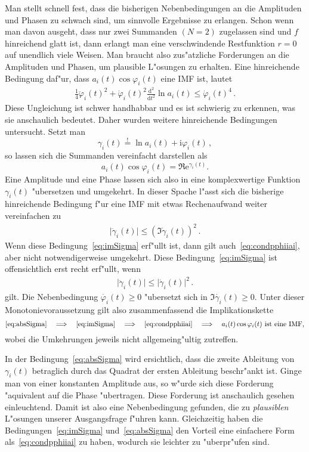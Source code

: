 \documentclass[a4paper]{scrartcl}
\newcommand{\de}{{\mathrm{d}}}
\newcommand{\ee}{{\mathrm{e}}}
\newcommand{\ii}{{\mathrm{i}}}
\newcommand{\pphi}{{\varphi}}
\newcommand{\defeq}{\overset{!}{=}}
\begin{document}
Man stellt schnell fest, dass die bisherigen Nebenbedingungen an die Amplituden und Phasen zu schwach sind, um sinnvolle Ergebnisse zu erlangen. 
Schon wenn man davon ausgeht, dass nur zwei Summanden $(N=2)$ zugelassen sind und $f$ hinreichend glatt ist, dann erlangt man eine verschwindende Restfunktion $r=0$ auf unendlich viele Weisen.
Man braucht also zus"atzliche Forderungen an die Amplituden und Phasen, um plausible L"osungen zu erhalten. 
Eine hinreichende Bedingung daf"ur, dass $a_i(t)\cos\pphi_i(t)$ eine IMF ist, lautet
\begin{align} \label{eq:condpphiiai}
  \frac14\ddot\pphi_i(t)^2 + \dot\pphi_i(t)^2\frac{\de^2}{\de t^2}\ln a_i(t) 
  \le \dot\pphi_i(t)^4\,.
\end{align}
Diese Ungleichung ist schwer handhabbar und es ist schwierig zu erkennen, was sie anschaulich bedeutet. 
Daher wurden weitere hinreichende Bedingungen untersucht. 
Setzt man
$$ \gamma_i(t) \defeq \ln a_i(t) + \ii\pphi_i(t)\,, $$
so lassen sich die Summanden vereinfacht darstellen als
$$ a_i(t)\cos\pphi_i(t) = \Re \ee^{\gamma_i(t)}. $$
Eine Amplitude und eine Phase lassen sich also in eine komplexwertige Funktion $\gamma_i(t)$ "ubersetzen und umgekehrt. 
In dieser Spache l"asst sich die bisherige hinreichende Bedingung f"ur eine IMF mit etwas Rechenaufwand weiter vereinfachen zu
\begin{align} \label{eq:imSigma}
  \lvert\ddot\gamma_i(t)\rvert \le \left(\Im\dot\gamma_i(t)\right)^2\,.
\end{align}
Wenn diese Bedingung~\eqref{eq:imSigma} erf"ullt ist, dann gilt auch~\eqref{eq:condpphiiai}, aber nicht notwendigerweise umgekehrt. 
Diese Bedingung~\eqref{eq:imSigma} ist offensichtlich erst recht erf"ullt, wenn 
\begin{align} \label{eq:absSigma}
  \lvert\ddot\gamma_i(t)\rvert \le\lvert\dot\gamma_i(t)\rvert^2\,.
\end{align}
gilt. Die Nebenbedingung $\dot{\pphi_i}(t) \ge 0$ "ubersetzt sich in $\Im\dot{\gamma_i}(t) \ge 0$. 
Unter dieser Monotonievoraussetzung gilt also zusammenfassend die Implikationskette 
$$ \text{\eqref{eq:absSigma}} \quad \Longrightarrow \quad
  \text{\eqref{eq:imSigma}} \quad \Longrightarrow \quad
  \text{\eqref{eq:condpphiiai}} \quad \Longrightarrow \quad
  \text{$a_i(t)\cos\pphi_i(t)$ ist eine IMF,} $$
wobei die Umkehrungen jeweils nicht allgemeing"ultig zutreffen. 

In der Bedingung~\eqref{eq:absSigma} wird ersichtlich, dass die zweite Ableitung von $\gamma_i(t)$ betraglich durch das Quadrat der ersten Ableitung beschr"ankt ist. 
Ginge man von einer konstanten Amplitude aus, so w"urde sich diese Forderung "aquivalent auf die Phase "ubertragen. 
Diese Forderung ist anschaulich gesehen einleuchtend. 
Damit ist also eine Nebenbedingung gefunden, die zu {\em plausiblen} L"osungen unserer Ausgangsfrage f"uhren kann. 
Gleichzeitig haben die Bedingungen~\eqref{eq:imSigma} und~\eqref{eq:absSigma} den Vorteil eine einfachere Form als~\eqref{eq:condpphiiai} zu haben, wodurch sie leichter zu "uberpr"ufen sind. 
\end{document}
